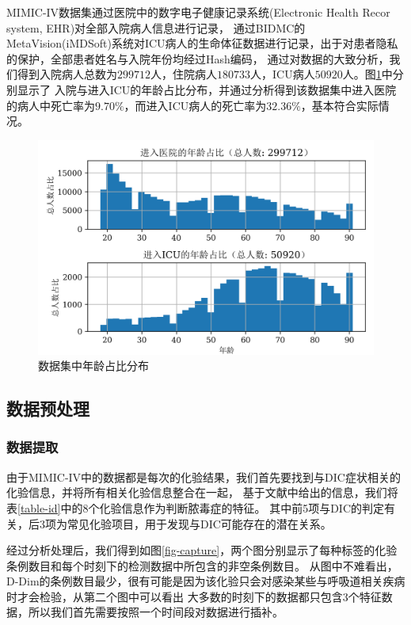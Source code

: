 \documentclass[12pt, a4paper, oneside]{ctexart}
\numberwithin{equation}{section}  %
\begin{document}
MIMIC-IV数据集通过医院中的数字电子健康记录系统(Electronic Health Recor system, EHR)对全部入院病人信息进行记录，
通过BIDMC的MetaVision(iMDSoft)系统对ICU病人的生命体征数据进行记录，出于对患者隐私的保护，全部患者姓名与入院年份均经过Hash编码，
通过对数据的大致分析，我们得到入院病人总数为$299712$人，住院病人$180733$人，ICU病人$50920$人。图\ref{fig-age}中分别显示了
入院与进入ICU的年龄占比分布，并通过分析得到该数据集中进入医院的病人中死亡率为$9.70\%$，而进入ICU病人的死亡率为$32.36\%$，基本符合实际情况。
\begin{figure}[H]
    \vspace{-1em}
    \includegraphics[width=\textwidth]{admission_vs_age_plot.png}
    \caption{数据集中年龄占比分布}
    \label{fig-age}
\end{figure}
\subsection{数据预处理}
\subsubsection{数据提取}
由于MIMIC-IV中的数据都是每次的化验结果，我们首先要找到与DIC症状相关的化验信息，并将所有相关化验信息整合在一起，
基于文献\cite{bib-determine-dic}中给出的信息，我们将表\ref{table-id}中的8个化验信息作为判断脓毒症的特征。
其中前5项与DIC的判定有关，后3项为常见化验项目，用于发现与DIC可能存在的潜在关系。

经过分析处理后，我们得到如图\ref{fig-capture}，两个图分别显示了每种标签的化验条例数目和每个时刻下的检测数据中所包含的非空条例数目。
从图中不难看出，D-Dim的条例数目最少，很有可能是因为该化验只会对感染某些与呼吸道相关疾病时才会检验，从第二个图中可以看出
大多数的时刻下的数据都只包含3个特征数据，所以我们首先需要按照一个时间段对数据进行插补。
\end{document}
